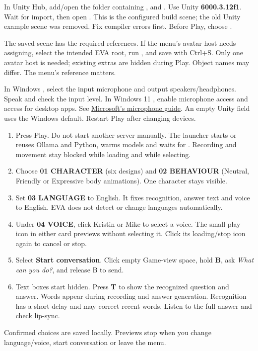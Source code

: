 \clearpage
{}
In Unity Hub, add/open the folder containing ,  and
. Use Unity \textbf{6000.3.12f1}. Wait for import, then open
. This is the configured build scene;
the old Unity example scene was removed. Fix compiler errors first.
Before Play, choose .

The saved scene has the required references. If the menu's avatar host needs
assigning, select the intended EVA root, run
, and save with Ctrl+S.
Only one avatar host is needed; existing extras are hidden during Play.
Object names may differ. The menu's  reference matters.

In Windows , select the input microphone and
output speakers/headphones. Speak and check the input level. In Windows 11
, enable microphone access
and access for desktop apps. See
\href{https://support.microsoft.com/en-us/windows/privacy/turn-on-app-permissions-for-your-microphone-in-windows}{Microsoft's microphone guide}.
An empty Unity  field uses the Windows default.
Restart Play after changing devices.

\begin{enumerate}
\item Press Play. Do not start another server manually. The launcher starts or
reuses Ollama and Python, warms models and waits for .
Recording and movement stay blocked while loading and while selecting.
\item Choose \textbf{01 CHARACTER} (six designs) and \textbf{02 BEHAVIOUR}
(Neutral, Friendly or Expressive body animations). One character stays visible.
\item Set \textbf{03 LANGUAGE} to English. It fixes recognition, answer text and
voice to English. EVA does not detect or change languages automatically.
\item Under \textbf{04 VOICE}, click Kristin or Mike to select a voice.
The small play icon in either card previews without selecting it.
Click its loading/stop icon again to cancel or stop.
\item Select \textbf{Start conversation}. Click empty Game-view space, hold
\textbf{B}, ask \textit{What can you do?}, and release B to send.
\item Text boxes start hidden. Press \textbf{T} to show the recognized question
and answer. Words appear during recording and answer generation. Recognition
has a short delay and may correct recent words. Listen to the full answer and check lip-sync.
\end{enumerate}
Confirmed choices are saved locally. Previews stop when you change
language/voice, start conversation or leave the menu.

